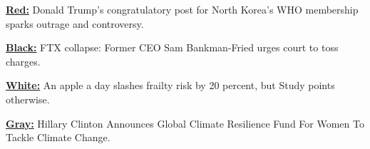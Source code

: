 \vspace{-7mm}
\begin{tcolorbox}[enhanced,attach boxed title to top right={yshift=-3mm,yshifttext=-1mm},
  colback=blue!5!white,colframe=blue!75!black,colbacktitle=red!80!black,
  title=$2^{nd}$ level: colors of lie,fonttitle=\bfseries,
  boxed title style={size=small,colframe=red!50!black},left=0pt, right=0pt ]

  \begin{spacing}{0.8}\textbf{\ul{\footnotesize Red:} }{\fontsize{8}{10}\selectfont
  Donald Trump's congratulatory post for North Korea's WHO membership sparks outrage and controversy.}
  \end{spacing} 

  \vspace{-2.5mm}
  \DrawLine

  \begin{spacing}{0.8}
  \textbf{\ul{\footnotesize Black:} }{\fontsize{8}{10}\selectfont
FTX collapse: Former CEO Sam Bankman-Fried urges court to toss charges.}
  \end{spacing}

  \vspace{-2.5mm}
  \DrawLine

  \begin{spacing}{0.8}
  \textbf{\ul{\footnotesize White:} }{\fontsize{8}{10}\selectfont 
An apple a day slashes frailty risk by 20 percent, but Study points otherwise.
}
  \end{spacing} 

  \vspace{-2.5mm}
  \DrawLine
  
  \begin{spacing}{0.8}
  \textbf{\ul{\footnotesize Gray:} }{\fontsize{8}{10}\selectfont
Hillary Clinton Announces Global Climate Resilience Fund For Women To Tackle Climate Change.}
  \end{spacing}
  
  \vspace{-1mm}
\end{tcolorbox}



